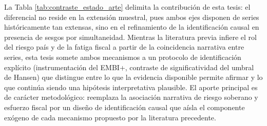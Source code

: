 La Tabla \ref{tab:contraste_estado_arte} delimita la contribución de esta tesis: el diferencial no reside en la extensión muestral, pues ambos ejes disponen de series históricamente tan extensas, sino en el refinamiento de la identificación causal en presencia de sesgos por simultaneidad. Mientras la literatura previa infiere el rol del riesgo país y de la fatiga fiscal a partir de la coincidencia narrativa entre series, esta tesis somete ambos mecanismos a un protocolo de identificación explícito (instrumentación del EMBI+, contraste de significatividad del umbral de Hansen) que distingue entre lo que la evidencia disponible permite afirmar y lo que continúa siendo una hipótesis interpretativa plausible. El aporte principal es de carácter metodológico: reemplaza la asociación narrativa de riesgo soberano y esfuerzo fiscal por un diseño de identificación causal que aísla el componente exógeno de cada mecanismo propuesto por la literatura precedente.
